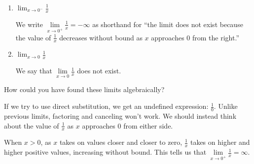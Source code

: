 \documentclass{article}
\begin{document}
\begin{enumerate}[resume]
\begin{enumerate}
\begin{solution}
      We write $\lim\limits_{x \to 0^+} \frac{1}{x}= \infty$ as shorthand for
      ``the limit does not exist because the value of $\frac{1}{x}$ increases without bound as $x$
      approaches $0$ from the right.''
    \end{solution}

  \item
    \begin{problem}
      $\displaystyle \lim_{x \to 0^-} \frac{1}{x}$
    \end{problem}

    \begin{solution}
      We write $\lim\limits_{x \to 0^+} \frac{1}{x}= -\infty$ as shorthand for
      ``the limit does not exist because the value of $\frac{1}{x}$ decreases without bound as $x$
      approaches $0$ from the right.''
    \end{solution}

  \item
    \begin{problem}[\stretch{1.5}]
      $\displaystyle \lim_{x \to 0} \frac{1}{x}$
    \end{problem}

    \begin{solution}
      We say that $\lim\limits_{x \to 0} \frac{1}{x}$ does not exist.
    \end{solution}

  \end{enumerate}


  \begin{problem}[\nstretch{1.5}]
    How could you have found these limits algebraically?
  \end{problem}

  \begin{solution}
    If we try to use direct substitution, we get an undefined expression: $\frac{1}{0}$. Unlike previous limits,
    factoring and canceling won't work. We should instead think about the value of $\frac{1}{x}$ as $x$ approaches
    $0$ from either side.

    When $x>0$, as $x$ takes on values closer and closer to zero,
    $\frac{1}{x}$ takes on higher and higher positive values,
    increasing without bound. This tells us that $\lim\limits_{x \to 0^+} \frac{1}{x}=\infty$.


\end{solution}
\end{enumerate}
\end{document}
